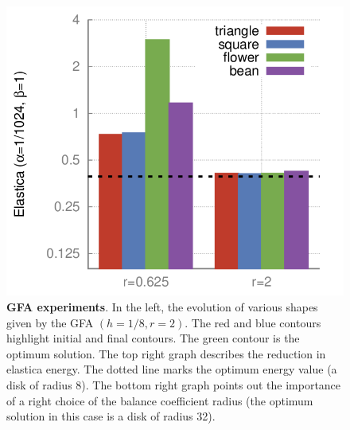 \documentclass[smallextended]{svjour3}
\begin{document}
\begin{figure}
\begin{minipage}{0.75\textwidth}
\includegraphics[scale=0.22]{figures/shape-flow/plots/bars.png}
\end{minipage}
\caption{\textbf{GFA experiments}. In the left, the evolution of various shapes given by the GFA $(h=1/8,r=2)$. The red and blue contours highlight initial and final contours. The green contour is the optimum solution. The top right graph describes the reduction in elastica energy. The dotted line marks the optimum energy value (a disk of radius $8$). The bottom right graph points out the importance of a right choice of the balance coefficient radius (the optimum solution in this case is a disk of radius 32).}
\label{fig:graph-flow-experiments}
\end{figure}
\end{document}

